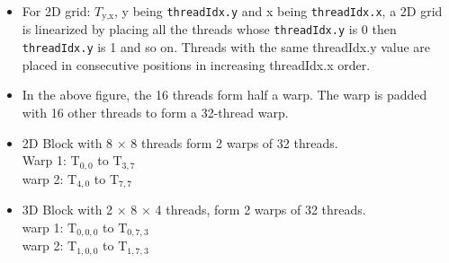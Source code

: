\begin{itemize}
\begin{center}
          \end{center}
    \item For 2D grid: $T_{\text{y,x}}$, y being \texttt{threadIdx.y} and x being \texttt{threadIdx.x}, a 2D grid is linearized by placing all the threads whose \texttt{threadIdx.y} is 0 then \texttt{threadIdx.y} is 1 and so on. Threads with the same threadIdx.y value are placed in consecutive positions in increasing threadIdx.x order.
    \item In the above figure, the 16 threads form half a warp. The warp is padded with 16 other threads to form a 32-thread warp.
    \item 2D Block with 8 $\times$ 8 threads form 2 warps of 32 threads.\\ Warp 1: $\text{T}_{0,0}$ to $\text{T}_{3,7}$\\ warp 2: $\text{T}_{4,0}$ to $\text{T}_{7,7}$
    \item 3D Block with 2 $\times$ 8 $\times$ 4 threads, form 2 warps of 32 threads. \\warp 1: $\text{T}_{0, 0, 0}$ to $\text{T}_{0,7,3}$ \\ warp 2: $\text{T}_{1,0,0}$ to $\text{T}_{1, 7, 3}$
\end{itemize}

